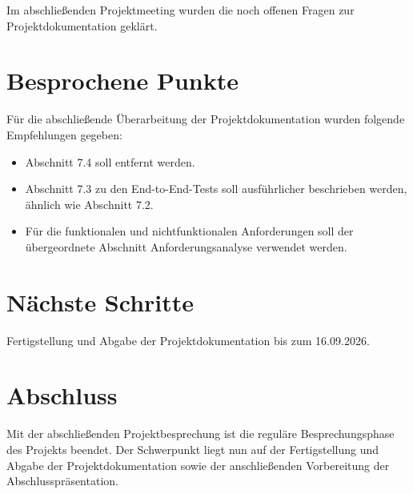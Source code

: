 \documentclass[a4paper,11pt]{article}
\begin{document}
Im abschließenden Projektmeeting wurden die noch offenen Fragen zur
Projektdokumentation geklärt.

\section{Besprochene Punkte}

Für die abschließende Überarbeitung der Projektdokumentation wurden
folgende Empfehlungen gegeben:

\begin{itemize}[leftmargin=1.2cm]

\item Abschnitt 7.4 soll entfernt werden.

\item Abschnitt 7.3 zu den End-to-End-Tests soll ausführlicher beschrieben werden, ähnlich wie Abschnitt 7.2.

\item Für die funktionalen und nichtfunktionalen Anforderungen soll der übergeordnete Abschnitt Anforderungsanalyse verwendet werden.

\end{itemize}


\section{Nächste Schritte}

Fertigstellung und Abgabe der Projektdokumentation bis zum 16.09.2026.


\section{Abschluss}

Mit der abschließenden Projektbesprechung ist die reguläre
Besprechungsphase des Projekts beendet. Der Schwerpunkt liegt nun auf
der Fertigstellung und Abgabe der Projektdokumentation sowie der
anschließenden Vorbereitung der Abschlusspräsentation.
\end{document}
